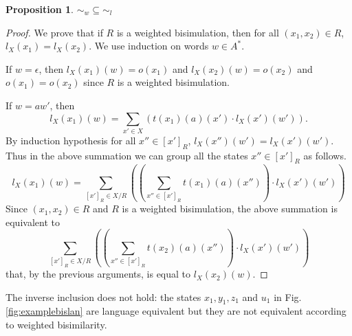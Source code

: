 \documentclass[3p]{elsarticle}
\newcommand{\fW}{\mathcal{W}}    %
\newcommand{\beh}[3]{\left[\!\left[ #1 \right]\!\right]^{#2}_{#3}} %
\newtheorem{proposition}{Proposition}
\begin{document}
%
\begin{proposition}
$\sim_w \subseteq \sim_l$
\end{proposition}
\begin{proof}
We prove that if  $R$ is a weighted bisimulation, then for all
$(x_1,x_2)\in R$, $l_X(x_1)=l_X(x_2)$. We use induction on words
$w\in A^*$.

If $w=\epsilon$, then $l_X(x_1)(w)=o(x_1)$ and $l_X(x_2)(w)=o(x_2)$
and $o(x_1)=o(x_2)$ since $R$ is a weighted bisimulation.

If $w=aw'$, then $$l_X(x_1)(w) =\sum_{x'\in X}(t(x_1)(a)(x')\cdot
l_X(x')(w'))\text{.}$$ By induction hypothesis for all $ x''\in
[x']_R$, $l_X(x'')(w')=l_X(x')(w')$. Thus in the above summation we
can group all the states $x''\in [x']_R$ as follows.
%
$$l_X(x_1)(w) =\sum_{[x']_R\in X/R}\left( \left(\sum_{x''\in [x']_R}
t(x_1)(a)(x'') \right) \cdot l_X(x')(w')  \right)$$
%
Since $(x_1,x_2)\in R$ and $R$ is a weighted bisimulation, the above
summation is equivalent to%
$$\sum_{[x']_R\in X/R}\left( \left(\sum_{x''\in [x']_R}
t(x_2)(a)(x'') \right) \cdot l_X(x')(w')  \right)$$ that, by the previous arguments, is
equal to $l_X(x_2)(w)$.
\end{proof}

The inverse inclusion does not hold: the states $x_1,y_1,z_1$ and $u_1$ in
Fig.\ref{fig:examplebislan} are language equivalent but they are not
equivalent according to weighted bisimilarity.
%

%


%
%
\end{document}
